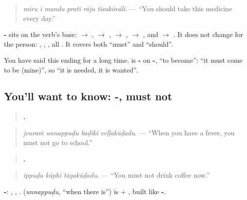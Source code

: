 \begin{quote}
\emph{mīru ī mandu prati rōju tīsukōvāli.} — \textquotedblleft{}You should take this medicine every day.\textquotedblright{}
\end{quote}

\textbf{-} sits on the verb's base: \textbf{} $\to$ \textbf{}, \textbf{} $\to$ \textbf{}, \textbf{} $\to$ \textbf{}, \textbf{} $\to$ \textbf{}, and \textbf{} $\to$ \textbf{}. It does not change for the person: \textbf{}, \textbf{}, \textbf{}, all \textbf{}. It covers both \textquotedblleft{}must\textquotedblright{} and \textquotedblleft{}should\textquotedblright{}.

You have said this ending for a long time. \textbf{} is \textbf{-} on \textbf{-}, \textquotedblleft{}to become\textquotedblright{}: \textquotedblleft{}it must come to be (mine)\textquotedblright{}, so \textquotedblleft{}it is needed, it is wanted\textquotedblright{}.

\subsection*{You'll want to know: -, must not}
\begin{quote}
\textbf{   .}
\end{quote}

\begin{quote}
\emph{jvaraṁ unnappuḍu baḍiki veḷḷakūḍadu.} — \textquotedblleft{}When you have a fever, you must not go to school.\textquotedblright{}
\end{quote}

\begin{quote}
\textbf{  .}
\end{quote}

\begin{quote}
\emph{ippuḍu kāphī tāgakūḍadu.} — \textquotedblleft{}You must not drink coffee now.\textquotedblright{}
\end{quote}

\textbf{-}: \textbf{}, \textbf{}, \textbf{}. \textbf{} (\emph{unnappuḍu}, \textquotedblleft{}when there is\textquotedblright{}) is \textbf{} + \textbf{}, built like \textbf{-}.

